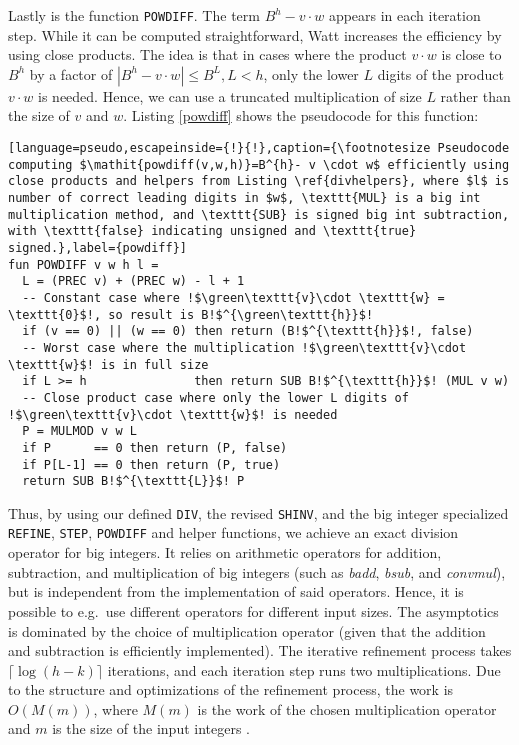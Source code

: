 Lastly is the function \texttt{POWDIFF}. The term $B^h-v \cdot w$ appears in each
iteration step. While it can be computed straightforward, Watt increases the
efficiency by using close products. The idea is that in cases where the product
$v\cdot w$ is close to $B^h$ by a factor of $|B^h- v\cdot w|\leq B^L, L < h$, only the
lower $L$ digits of the product $v \cdot w$ is needed. Hence, we can use a truncated
multiplication of size $L$ rather than the size of $v$ and $w$. Listing
\ref{powdiff} shows the pseudocode for this function:
\begin{lstlisting}[language=pseudo,escapeinside={!}{!},caption={\footnotesize Pseudocode computing $\mathit{powdiff(v,w,h)}=B^{h}- v \cdot w$ efficiently using close products and helpers from Listing \ref{divhelpers}, where $l$ is number of correct leading digits in $w$, \texttt{MUL} is a big int multiplication method, and \texttt{SUB} is signed big int subtraction, with \texttt{false} indicating unsigned and \texttt{true} signed.},label={powdiff}]
fun POWDIFF v w h l =
  L = (PREC v) + (PREC w) - l + 1
  -- Constant case where !$\green\texttt{v}\cdot \texttt{w} = \texttt{0}$!, so result is B!$^{\green\texttt{h}}$!
  if (v == 0) || (w == 0) then return (B!$^{\texttt{h}}$!, false)
  -- Worst case where the multiplication !$\green\texttt{v}\cdot \texttt{w}$! is in full size
  if L >= h               then return SUB B!$^{\texttt{h}}$! (MUL v w)
  -- Close product case where only the lower L digits of !$\green\texttt{v}\cdot \texttt{w}$! is needed
  P = MULMOD v w L
  if P      == 0 then return (P, false)
  if P[L-1] == 0 then return (P, true)
  return SUB B!$^{\texttt{L}}$! P
\end{lstlisting}

Thus, by using our defined \texttt{DIV}, the revised \texttt{SHINV}, and the big
integer specialized \texttt{REFINE}, \texttt{STEP}, \texttt{POWDIFF} and helper
functions, we achieve an exact division operator for big integers. It relies on
arithmetic operators for addition, subtraction, and multiplication of big
integers (such as \textit{badd}, \textit{bsub}, and \textit{convmul}), but is
independent from the implementation of said operators. Hence, it is possible to
e.g.\ use different operators for different input sizes. The asymptotics is
dominated by the choice of multiplication operator (given that the addition and
subtraction is efficiently implemented). The iterative refinement process takes
$\lceil \log (h-k) \rceil$ iterations, and each iteration step runs two
multiplications. Due to the structure and optimizations of the refinement
process, the work is $O(M(m))$, where $M(m)$ is the work of the chosen
multiplication operator and $m$ is the size of the input integers
\cite{watt2023efficient}.




